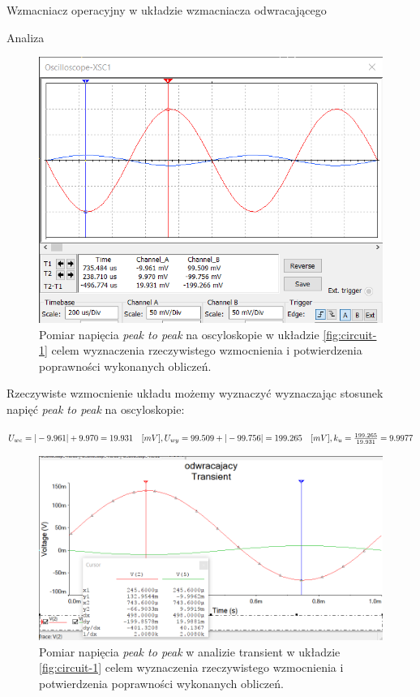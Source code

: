 \documentclass[a4paper]{scrartcl}
\begin{document}
\begin{section}{Wzmacniacz operacyjny w układzie wzmacniacza odwracającego}
\begin{subsection}{Analiza}
				\begin{figure}[ht]
				\begin{center}
					\includegraphics[width=0.6\linewidth]{03-osc}
					\caption{Pomiar napięcia \textit{peak to peak} na oscyloskopie w układzie \ref{fig:circuit-1} celem wyznaczenia rzeczywistego wzmocnienia i potwierdzenia poprawności wykonanych obliczeń.}
				\end{center}
				\end{figure}
				\pagebreak

				Rzeczywiste wzmocnienie układu możemy wyznaczyć wyznaczając stosunek napięć \textit{peak to peak} na oscyloskopie: \\
				\begin{center}
					\begin{math}
					 U_{we} = \vert-9.961\vert + 9.970 = 19.931\quad [mV], \\ 
					 U_{wy} = 99.509 + \vert-99.756\vert = 199.265 \quad [mV],\\
					 k_{u} = \frac{199.265}{19.931} = 9.9977 
					\end{math}
				\end{center}

				\begin{figure}[!ht]
				\begin{center}
					\includegraphics[width=0.7\linewidth,scale=2]{03-peak2peak}
					\caption{Pomiar napięcia \textit{peak to peak} w analizie transient w układzie \ref{fig:circuit-1} celem wyznaczenia rzeczywistego wzmocnienia i potwierdzenia poprawności wykonanych obliczeń.}
					\label{fig:circuit-1-transient}
				\end{center}
				\end{figure}


\end{subsection}
\end{section}
\end{document}
